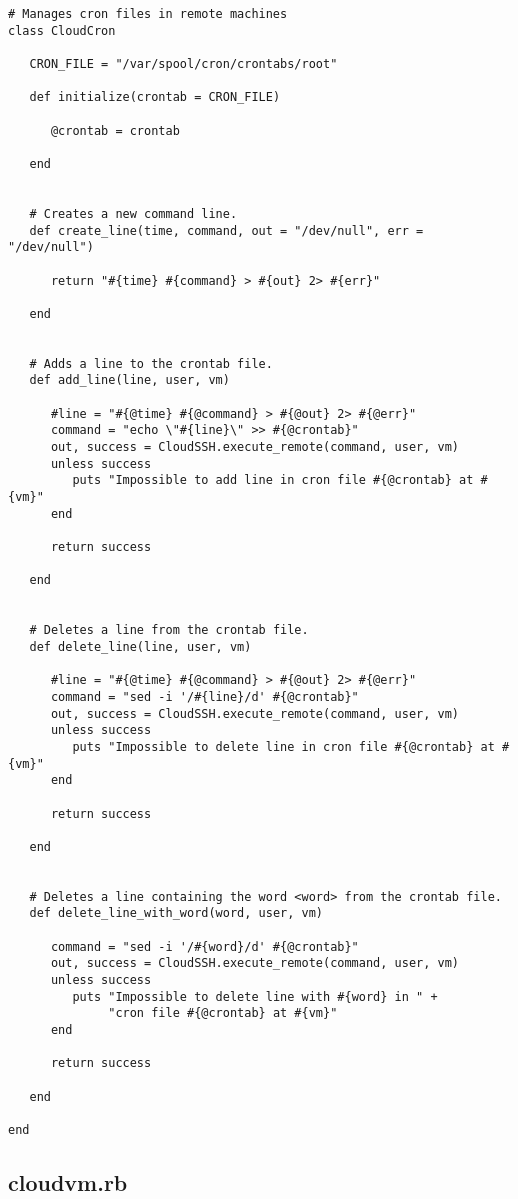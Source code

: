 \begin{lstlisting}
# Manages cron files in remote machines
class CloudCron

   CRON_FILE = "/var/spool/cron/crontabs/root"

   def initialize(crontab = CRON_FILE)

      @crontab = crontab

   end


   # Creates a new command line.
   def create_line(time, command, out = "/dev/null", err = "/dev/null")

      return "#{time} #{command} > #{out} 2> #{err}"

   end


   # Adds a line to the crontab file.
   def add_line(line, user, vm)

      #line = "#{@time} #{@command} > #{@out} 2> #{@err}"
      command = "echo \"#{line}\" >> #{@crontab}"
      out, success = CloudSSH.execute_remote(command, user, vm)
      unless success
         puts "Impossible to add line in cron file #{@crontab} at #{vm}"
      end

      return success

   end


   # Deletes a line from the crontab file.
   def delete_line(line, user, vm)

      #line = "#{@time} #{@command} > #{@out} 2> #{@err}"
      command = "sed -i '/#{line}/d' #{@crontab}"
      out, success = CloudSSH.execute_remote(command, user, vm)
      unless success
         puts "Impossible to delete line in cron file #{@crontab} at #{vm}"
      end

      return success

   end


   # Deletes a line containing the word <word> from the crontab file.
   def delete_line_with_word(word, user, vm)

      command = "sed -i '/#{word}/d' #{@crontab}"
      out, success = CloudSSH.execute_remote(command, user, vm)
      unless success
         puts "Impossible to delete line with #{word} in " + 
              "cron file #{@crontab} at #{vm}"
      end

      return success

   end

end
\end{lstlisting}


\subsection{cloudvm.rb}


